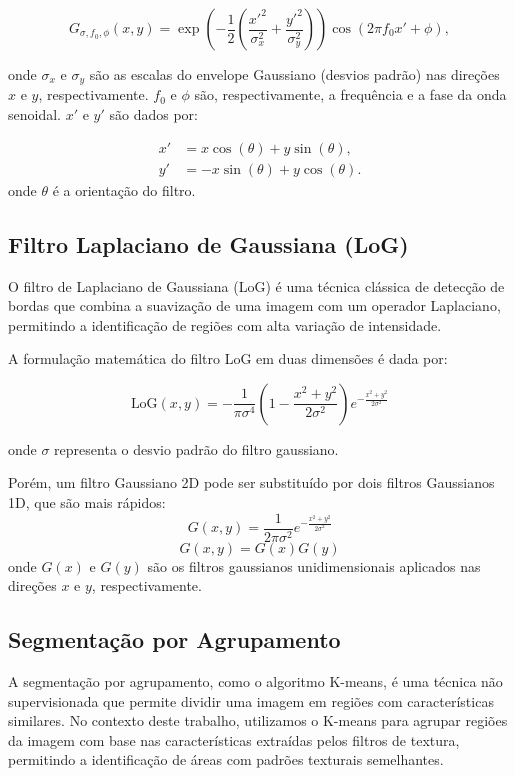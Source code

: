 \documentclass[sigconf,nonacm]{acmart}
\begin{document}
\[
G_{\sigma,f_0,\phi}(x,y) = \exp\left(-\frac{1}{2} \left(\frac{x'^2}{\sigma_x^2} + \frac{y'^2}{\sigma_y^2}\right)\right) \cos\left(2\pi f_0 x' + \phi\right),
\]

onde \(\sigma_x\) e \(\sigma_y\) são as escalas do envelope Gaussiano (desvios padrão) nas direções \(x\) e \(y\), respectivamente. \(f_0\) e \(\phi\) são, respectivamente, a frequência e a fase da onda senoidal. \(x'\) e \(y'\) são dados por:

\[
\begin{aligned}
x' &= x \cos(\theta) + y \sin(\theta), \\
y' &= -x \sin(\theta) + y \cos(\theta).
\end{aligned}
\]
onde \(\theta\) é a orientação do filtro.

\subsection{Filtro Laplaciano de Gaussiana (LoG)}

O filtro de Laplaciano de Gaussiana (LoG) é uma técnica clássica de detecção de bordas que combina a suavização de uma imagem com um operador Laplaciano, permitindo a identificação de regiões com alta variação de intensidade.

A formulação matemática do filtro LoG em duas dimensões é dada por:

\[
\text{LoG}(x, y) = -\frac{1}{\pi\sigma^4}\left(1 - \frac{x^2 + y^2}{2\sigma^2}\right)e^{-\frac{x^2 + y^2}{2\sigma^2}}
\]

onde \(\sigma\) representa o desvio padrão do filtro gaussiano.

Porém, um filtro Gaussiano 2D pode ser
substituído por dois filtros Gaussianos 1D,
que são mais rápidos:
\[
G(x,y) = \frac{1}{2\pi\sigma^2}e^{-\frac{x^2 + y^2}{2\sigma^2}} 
\]
\[
G(x,y) = G(x)G(y)
\]
onde \(G(x)\) e \(G(y)\) são os filtros gaussianos unidimensionais aplicados nas direções \(x\) e \(y\), respectivamente.



\subsection{Segmentação por Agrupamento}

A segmentação por agrupamento, como o algoritmo K-means, é uma técnica não supervisionada que permite dividir uma imagem em regiões com características similares. No contexto deste trabalho, utilizamos o K-means para agrupar regiões da imagem com base nas características extraídas pelos filtros de textura, permitindo a identificação de áreas com padrões texturais semelhantes.
\end{document}
